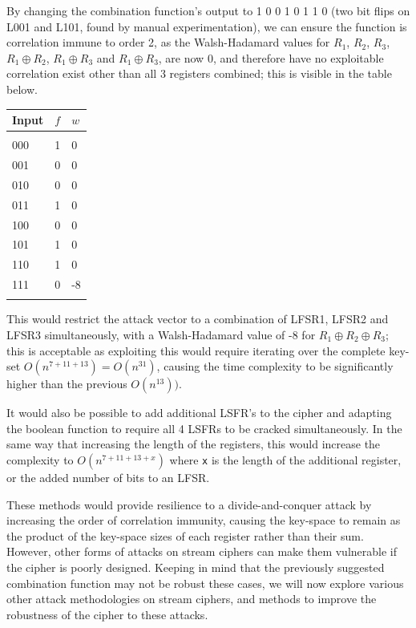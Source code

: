 \documentclass[british,10pt,a4paper]{article}
\begin{document}
By changing the combination function's output to 1 0 0 1 0 1 1 0 (two bit flips on L001 and L101, found by manual experimentation), we can ensure the function
is correlation immune to order 2, as the Walsh-Hadamard values for \(R_1\),
\(R_2\),  \(R_3\),  \(R_1 \oplus R_2\), \(R_1 \oplus R_3\) and \(R_1 \oplus R_3\), are now 0,
and therefore have no exploitable correlation exist other than all 3 registers combined; this is visible in the table below.

\begin{center}
	\begin{tabular}{@{}lll@{}}\label{tab:walsh2} \\
		Input & \(f\) & \(w\) \\
		\midrule \\
		000   & 1     & 0     \\
		001   & 0     & 0     \\
		010   & 0     & 0     \\
		011   & 1     & 0     \\
		100   & 0     & 0     \\
		101   & 1     & 0     \\
		110   & 1     & 0     \\
		111   & 0     & -8    \\
		\bottomrule \\
	\end{tabular}
\end{center}
This would restrict the attack vector to a combination of LFSR1, LFSR2 and LFSR3 simultaneously, with a Walsh-Hadamard value of -8 for \(R_1 \oplus R_2 \oplus R_3\); this is acceptable as exploiting this would require iterating over the complete key-set \(O(n^{7+11+13}) = O(n^{31})\), causing the time complexity to be significantly higher than the previous \(O(n^{13}))\).

It would also be possible to add additional LSFR's to the cipher and adapting the boolean function to require all 4 LSFRs to be cracked simultaneously. In the same way that increasing the length of the registers, this would increase the complexity to \(O(n^{7+11+13+x})\) where \lstinline{x} is the length of the additional register, or the added number of bits to an LFSR.

These methods would provide resilience to a divide-and-conquer attack by increasing the order of correlation immunity, causing the key-space to remain as the product of the key-space sizes of each register rather than their sum. However, other forms of attacks on stream ciphers can make them vulnerable if the cipher is poorly designed. Keeping in mind that the previously suggested combination function may not be robust these cases, we will now explore various other attack methodologies on stream ciphers, and methods to improve the robustness of the cipher to these attacks.
\end{document}
